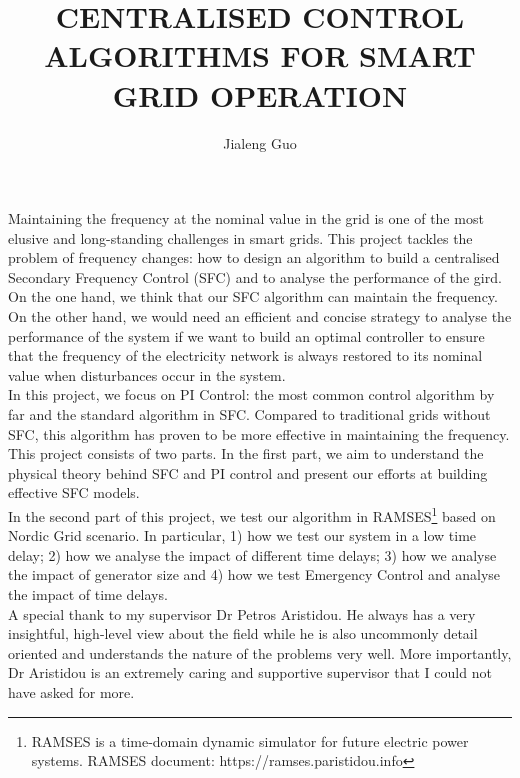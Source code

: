 \documentclass{report}
\begin{document}
\title{CENTRALISED CONTROL ALGORITHMS FOR SMART GRID OPERATION}
\author{Jialeng Guo}

\beforepreface
{}
Maintaining the frequency at the nominal value in the grid is one of the most elusive and long-standing challenges in smart grids. This project tackles the problem of frequency changes: how to design an algorithm to build a centralised Secondary Frequency Control (SFC) and to analyse the performance of the gird. On the one hand, we think that our SFC algorithm can maintain the frequency. On the other hand, we would need an efficient and concise strategy to analyse the performance of the system if we want to build an optimal controller to ensure that the frequency of the electricity network is always restored to its nominal value when disturbances occur in the system.\\

In this project, we focus on PI Control: the most common control algorithm by far and the standard algorithm in SFC. Compared to traditional grids without SFC, this algorithm has proven to be more effective in maintaining the frequency.\\

This project consists of two parts. In the first part, we aim to understand the physical theory behind SFC and PI control and present our efforts at building effective SFC models.\\

In the second part of this project, we test our algorithm in RAMSES\textcolor{red}{\footnote{RAMSES is a time-domain dynamic simulator for future electric power systems. RAMSES document: https://ramses.paristidou.info}} based on Nordic Grid scenario. In particular, 1) how we test our system in a low time delay; 2) how we analyse the impact of different time delays; 3) how we analyse the impact of generator size and 4) how we test Emergency Control and analyse the impact of time delays.\\

A special thank to my supervisor Dr Petros Aristidou. He always has a very insightful, high-level view about the field while he is also uncommonly detail oriented and understands the nature of the problems very well. More importantly, Dr Aristidou is an extremely caring and supportive supervisor that I could not have asked for more.\\
\end{document}

